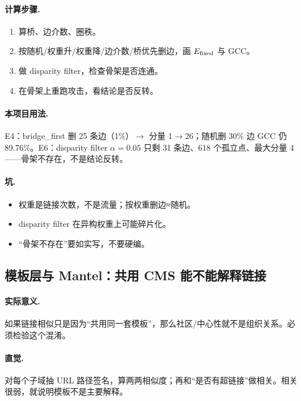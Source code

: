 \paragraph{计算步骤.}
\begin{enumerate}
  \item 算桥、边介数、圈秩。
  \item 按随机/权重升/权重降/边介数/桥优先删边，画 \(E_{\mathrm{fixed}}\) 与 GCC。
  \item 做 disparity filter，检查骨架是否连通。
  \item 在骨架上重跑攻击，看结论是否反转。
\end{enumerate}

\paragraph{本项目用法.}
\unit{E4}：bridge\_first 删 25 条边（1\%）\(\to\) 分量 1\(\to\)26；随机删 30\% 边 GCC 仍 89.76\%。\unit{E6}：disparity filter \(\alpha=0.05\) 只剩 31 条边、618 个孤立点、最大分量 4——骨架不存在，不是结论反转。

\paragraph{坑.}
\begin{itemize}
  \item 权重是链接次数，不是流量；按权重删边≈随机。
  \item disparity filter 在异构权重上可能碎片化。
  \item “骨架不存在”要如实写，不要硬编。
\end{itemize}

\subsection{模板层与 Mantel：共用 CMS 能不能解释链接}

\paragraph{实际意义.}
如果链接相似只是因为“共用同一套模板”，那么社区/中心性就不是组织关系。必须检验这个混淆。

\paragraph{直觉.}
对每个子域抽 URL 路径签名，算两两相似度；再和“是否有超链接”做相关。相关很弱，就说明模板不是主要解释。

